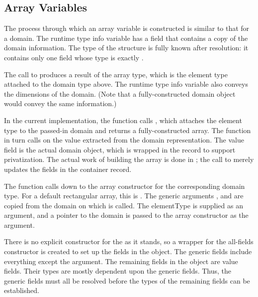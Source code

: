 \subsection{Array Variables}

The process through which an array variable is constructed is similar to that for a
domain.  The runtime type info variable has a field that contains a copy of the domain
information. The type of the structure is fully known after resolution: it contains only
one field whose type is exactly .

The call to  produces a result of the array type,
which is the element type  attached to the domain type above.  The runtime
type info variable also conveys the dimensions of the domain.  (Note that a
fully-constructed domain object would convey the same information.)

In the current implementation, the function  calls
, which attaches the element type to the passed-in domain
and returns a fully-constructed array.  The  function in turn calls
 on the value extracted from the domain representation.  The value
field is the actual domain object, which is wrapped in the  record to support
privatization.  The actual work of building the array is done in ; the
call to  merely updates the fields in the container record.

The function  calls down to the array constructor for the
corresponding domain type.  For a default rectangular array, this is
.  The generic arguments ,  and
 are copied from the domain on which  is called.  The
elementType is supplied as an argument, and a pointer to the domain is passed to the
array constructor as the  argument.

There is no explicit constructor for the  as it stands, so a
wrapper for the all-fields constructor is created to set up the fields in the
 object.  The generic fields include everything except the
 argument.  The remaining fields in the object are value fields.  Their types
are mostly dependent upon the generic fields.  Thus, the generic fields must all be
resolved before the types of the remaining fields can be established.


